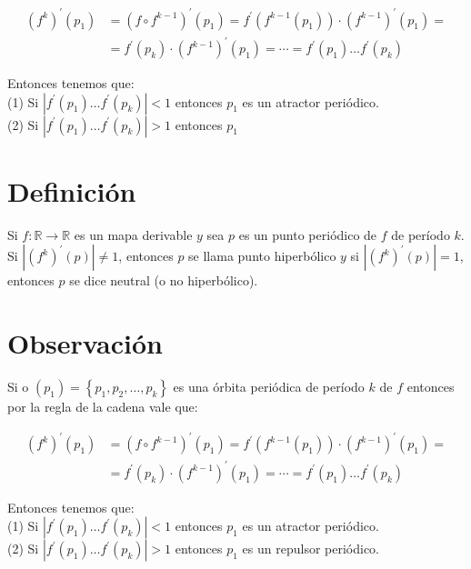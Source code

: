 \documentclass[11pt]{beamer}
\begin{document}
\begin{align*}
\left(f^{k}\right)^{\prime}\left(p_{1}\right) & =\left(f \circ f^{k-1}\right)^{\prime}\left(p_{1}\right)=f^{\prime}\left(f^{k-1}\left(p_{1}\right)\right) \cdot\left(f^{k-1}\right)^{\prime}\left(p_{1}\right)=  \tag{1}\\
& =f^{\prime}\left(p_{k}\right) \cdot\left(f^{k-1}\right)^{\prime}\left(p_{1}\right)=\cdots=f^{\prime}\left(p_{1}\right) \ldots f^{\prime}\left(p_{k}\right) \tag{2}
\end{align*}


Entonces tenemos que:\\
(1) Si $\left|f^{\prime}\left(p_{1}\right) \ldots f^{\prime}\left(p_{k}\right)\right|<1$ entonces $p_{1}$ es un atractor periódico.\\
(2) Si $\left|f^{\prime}\left(p_{1}\right) \ldots f^{\prime}\left(p_{k}\right)\right|>1$ entonces $p_{1}$

\section*{Definición}
Si $f: \mathbb{R} \rightarrow \mathbb{R}$ es un mapa derivable $y$ sea $p$ es un punto periódico de $f$ de período $k$. Si $\left|\left(f^{k}\right)^{\prime}(p)\right| \neq 1$, entonces $p$ se llama punto hiperbólico $y$ si $\left|\left(f^{k}\right)^{\prime}(p)\right|=1$, entonces $p$ se dice neutral (o no hiperbólico).

\section*{Observación}
Si o $\left(p_{1}\right)=\left\{p_{1}, p_{2}, \ldots, p_{k}\right\}$ es una órbita periódica de período $k$ de $f$ entonces por la regla de la cadena vale que:


\begin{align*}
\left(f^{k}\right)^{\prime}\left(p_{1}\right) & =\left(f \circ f^{k-1}\right)^{\prime}\left(p_{1}\right)=f^{\prime}\left(f^{k-1}\left(p_{1}\right)\right) \cdot\left(f^{k-1}\right)^{\prime}\left(p_{1}\right)=  \tag{1}\\
& =f^{\prime}\left(p_{k}\right) \cdot\left(f^{k-1}\right)^{\prime}\left(p_{1}\right)=\cdots=f^{\prime}\left(p_{1}\right) \ldots f^{\prime}\left(p_{k}\right) \tag{2}
\end{align*}


Entonces tenemos que:\\
(1) Si $\left|f^{\prime}\left(p_{1}\right) \ldots f^{\prime}\left(p_{k}\right)\right|<1$ entonces $p_{1}$ es un atractor periódico.\\
(2) Si $\left|f^{\prime}\left(p_{1}\right) \ldots f^{\prime}\left(p_{k}\right)\right|>1$ entonces $p_{1}$ es un repulsor periódico.
\end{document}
